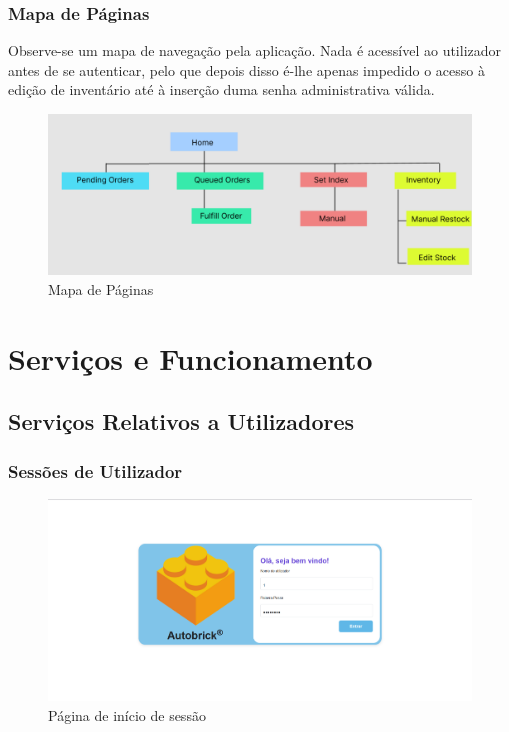             \subsubsection{Mapa de Páginas}
                Observe-se um mapa de navegação pela aplicação. Nada é acessível ao utilizador antes de se autenticar, pelo que depois disso é-lhe apenas impedido o acesso à edição de inventário até à inserção duma senha administrativa válida.

                \begin{figure}[h!]
                    \centering
                    \includegraphics[width=0.99\linewidth, frame]{images/Site/sitemap.pdf}
                    \caption{Mapa de Páginas}
                    \label{fig:sitemap}
                \end{figure}
                
    \newpage
    \section{Serviços e Funcionamento} %
        
            \subsection{Serviços Relativos a Utilizadores}
                \subsubsection{Sessões de Utilizador}

                            \begin{figure}[h!]
                                \centering
                                \includegraphics[width=0.8\linewidth, frame]{images/Site/Login.pdf}
                                \caption{Página de início de sessão}
                                \label{fig:Página de login}
                            \end{figure}

